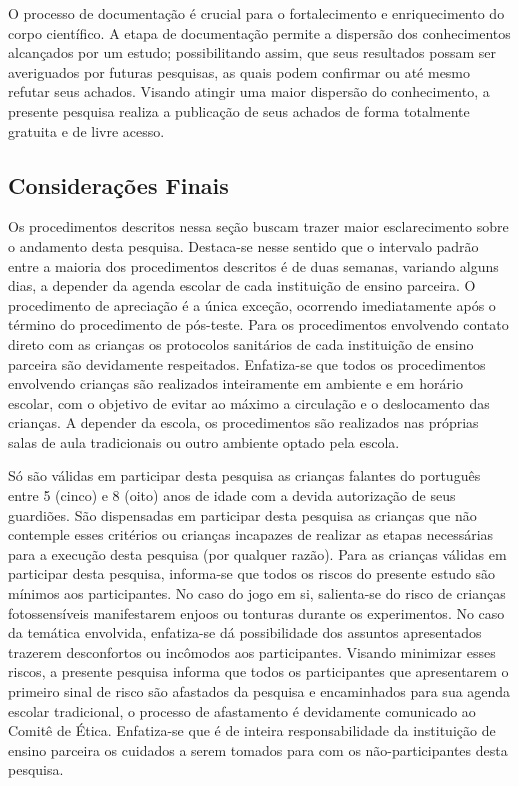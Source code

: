 O processo de documentação é crucial para o fortalecimento e enriquecimento do corpo científico. A etapa de documentação permite a dispersão dos conhecimentos alcançados por um estudo; possibilitando assim, que seus resultados possam ser averiguados por futuras pesquisas, as quais podem confirmar ou até mesmo refutar seus achados. Visando atingir uma maior dispersão do conhecimento, a presente pesquisa realiza a publicação de seus achados de forma totalmente gratuita e de livre acesso.


\subsection{Considerações Finais}\label{subsec:CF}

Os procedimentos descritos nessa seção buscam trazer maior esclarecimento sobre o andamento desta pesquisa. Destaca-se nesse sentido que o intervalo padrão entre a maioria dos procedimentos descritos é de duas semanas, variando alguns dias, a depender da agenda escolar de cada instituição de ensino parceira. O procedimento de apreciação é a única exceção, ocorrendo imediatamente após o término do procedimento de pós-teste. Para os procedimentos envolvendo contato direto com as crianças os protocolos sanitários de cada instituição de ensino parceira são devidamente respeitados. Enfatiza-se que todos os procedimentos envolvendo crianças são realizados inteiramente em ambiente e em horário escolar, com o objetivo de evitar ao máximo a circulação e o deslocamento das crianças. A depender da escola, os procedimentos são realizados nas próprias salas de aula tradicionais ou outro ambiente optado pela escola. 

Só são válidas em participar desta pesquisa as crianças falantes do português entre 5 (cinco) e 8 (oito) anos de idade com a devida autorização de seus guardiões. São dispensadas em participar desta pesquisa as crianças que não contemple esses critérios ou crianças incapazes de realizar as etapas necessárias para a execução desta pesquisa (por qualquer razão). Para as crianças válidas em participar desta pesquisa, informa-se que todos os riscos do presente estudo são mínimos aos participantes. No caso do jogo em si, salienta-se do risco de crianças fotossensíveis manifestarem enjoos ou tonturas durante os experimentos. No caso da temática envolvida, enfatiza-se dá possibilidade dos assuntos apresentados trazerem desconfortos ou incômodos aos participantes. Visando minimizar esses riscos, a presente pesquisa informa que todos os participantes que apresentarem o primeiro sinal de risco são afastados da pesquisa e encaminhados para sua agenda escolar tradicional, o processo de afastamento é devidamente comunicado ao Comitê de Ética. %
Enfatiza-se que é de inteira responsabilidade da instituição de ensino parceira os cuidados a serem tomados para com os não-participantes desta pesquisa. 

